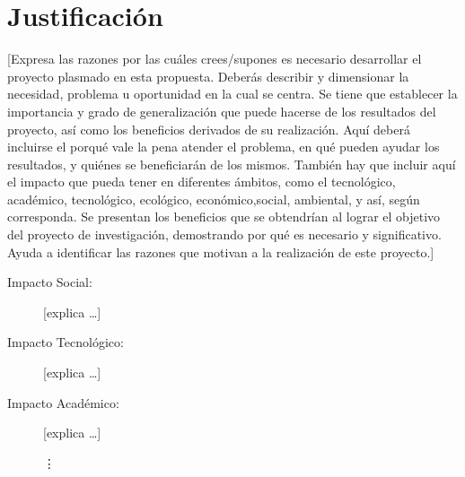 \section{Justificación}

[Expresa las razones por las cuáles crees/supones es necesario desarrollar el proyecto plasmado en esta propuesta. 
Deberás describir y dimensionar la necesidad, problema u oportunidad en la cual se centra. 
Se tiene que establecer la importancia y grado de generalización que puede hacerse de los resultados del proyecto, así como los beneficios derivados de su realización. 
Aquí deberá incluirse el porqué vale la pena atender el problema, en qué pueden ayudar los resultados, y quiénes se beneficiarán de los mismos. También hay que incluir aquí el impacto que pueda tener en diferentes ámbitos, como el  tecnológico, académico, tecnológico, ecológico, económico,social, ambiental, y así, según corresponda. 
Se presentan los beneficios que se obtendrían al lograr el objetivo del proyecto de investigación, demostrando por qué es necesario y significativo. 
Ayuda a identificar las razones que motivan a la realización de este proyecto.]
\begin{description}
\item [Impacto Social:] [explica
\dots]


\item [Impacto Tecnológico:]
[explica
\dots]

\item [Impacto Académico:] 
[explica \dots]

\vdots


\end{description}